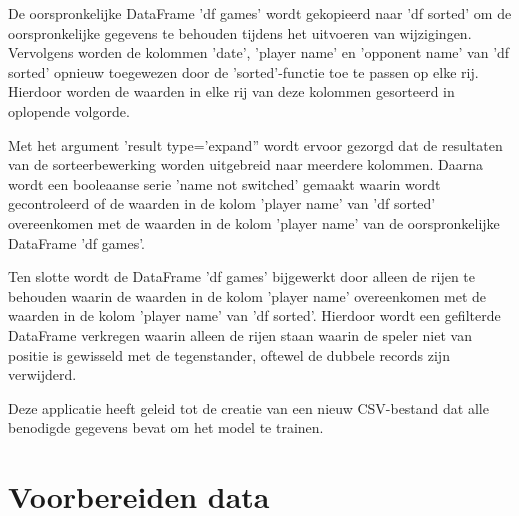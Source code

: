 De oorspronkelijke DataFrame 'df games' wordt gekopieerd naar 'df sorted' om de oorspronkelijke gegevens te behouden tijdens het uitvoeren van wijzigingen. Vervolgens worden de kolommen 'date', 'player name' en 'opponent name' van 'df sorted' opnieuw toegewezen door de 'sorted'-functie toe te passen op elke rij. Hierdoor worden de waarden in elke rij van deze kolommen gesorteerd in oplopende volgorde.

Met het argument 'result type='expand'' wordt ervoor gezorgd dat de resultaten van de sorteerbewerking worden uitgebreid naar meerdere kolommen. Daarna wordt een booleaanse serie 'name not switched' gemaakt waarin wordt gecontroleerd of de waarden in de kolom 'player name' van 'df sorted' overeenkomen met de waarden in de kolom 'player name' van de oorspronkelijke DataFrame 'df games'.

Ten slotte wordt de DataFrame 'df games' bijgewerkt door alleen de rijen te behouden waarin de waarden in de kolom 'player name' overeenkomen met de waarden in de kolom 'player name' van 'df sorted'. Hierdoor wordt een gefilterde DataFrame verkregen waarin alleen de rijen staan waarin de speler niet van positie is gewisseld met de tegenstander, oftewel de dubbele records zijn verwijderd.

Deze applicatie heeft geleid tot de creatie van een nieuw CSV-bestand dat alle benodigde gegevens bevat om het model te trainen.

\section{Voorbereiden data}

